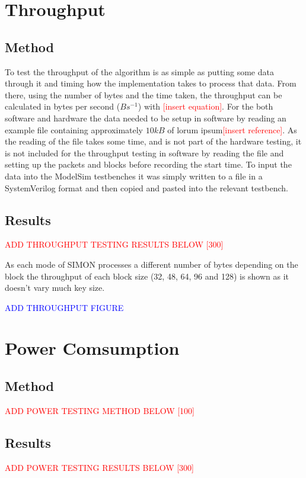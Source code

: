 \documentclass[12pt,twoside,a4paper]{report}
\begin{document}
	\section{Throughput}
	
	\subsection{Method}
	To test the throughput of the algorithm is as simple as putting some data through it and timing how the implementation takes to process that data. From there, using the number of bytes and the time taken, the throughput can be calculated in bytes per second ($Bs^{-1}$) with \textcolor{red}{[insert equation]}. For the both software and hardware the data needed to be setup in software by reading an example file containing approximately $10kB$ of lorum ipsum\textcolor{red}{[insert reference]}. As the reading of the file takes some time, and is not part of the hardware testing, it is not included for the throughput testing in software by reading the file and setting up the packets and blocks before recording the start time. To input the data into the ModelSim testbenches it was simply written to a file in a SystemVerilog format and then copied and pasted into the relevant testbench.
	
	\subsection{Results}
	\textcolor{red}{ADD THROUGHPUT TESTING RESULTS BELOW [300]}
	
	As each mode of SIMON processes a different number of bytes depending on the block the throughput of each block size (32, 48, 64, 96 and 128) is shown as it doesn't vary much key size. 
	
	\textcolor{blue}{ADD THROUGHPUT FIGURE}

	\section{Power Comsumption}
	
	\subsection{Method}
	\textcolor{red}{ADD POWER TESTING METHOD BELOW [100]}
	
	\subsection{Results}
	\textcolor{red}{ADD POWER TESTING RESULTS BELOW [300]}
\end{document}
